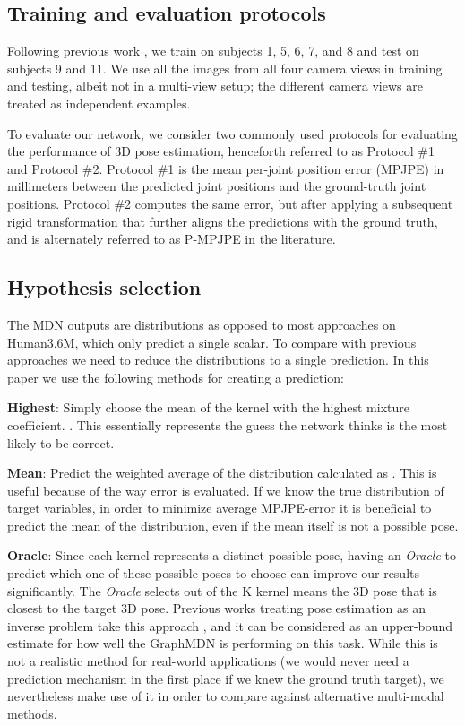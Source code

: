 \subsection{Training and evaluation protocols}\label{experiments_training}

   Following previous work \cite{Zhao_2019_CVPR, pavllo20193d, jahangiri2017generating, Li_2019_CVPR}, we train on subjects 1, 5, 6, 7, and 8 and test on subjects 9 and 11. We use all the images from all four camera views in training and testing, albeit not in a multi-view setup; the different camera views are treated as independent examples. 

   To evaluate our network, we consider two commonly used protocols for evaluating the performance of 3D pose estimation, henceforth referred to as Protocol \#1 and Protocol \#2. Protocol \#1 is the mean per-joint position error (MPJPE) in millimeters between the predicted joint positions and the ground-truth joint positions. Protocol \#2 computes the same error, but after applying a subsequent rigid transformation that further aligns the predictions with the ground truth, and is alternately referred to as P-MPJPE in the literature. 

\subsection{Hypothesis selection}
The MDN outputs are distributions as opposed to most approaches on Human3.6M, which only predict a single scalar. To compare with previous approaches we need to reduce the distributions to a single prediction. In this paper we use the following methods for creating a prediction:

\textbf{Highest}: Simply choose the mean of the kernel  with the highest mixture coefficient. . This essentially represents the guess the network thinks is the most likely to be correct.

\textbf{Mean}: Predict the weighted average of the distribution calculated as 
.
This is useful because of the way error is evaluated. If we know the true distribution of target variables, in order to minimize average MPJPE-error it is beneficial to predict the mean of the distribution, even if the mean itself is not a possible pose. 

\textbf{Oracle}: Since each kernel represents a distinct possible pose, having an \textit{Oracle} to predict which one of these possible poses to choose can improve our results significantly. The \textit{Oracle} selects out of the K kernel means the 3D pose that is closest to the target 3D pose. Previous works treating pose estimation as an inverse problem take this approach \cite{Li_2019_CVPR,jahangiri2017generating, Sharma_2019_ICCV}, and it can be considered as an upper-bound estimate for how well the GraphMDN is performing on this task. While this is not a realistic method for real-world applications (we would never need a prediction mechanism in the first place if we knew the ground truth target), we nevertheless make use of it in order to compare against alternative multi-modal methods.


